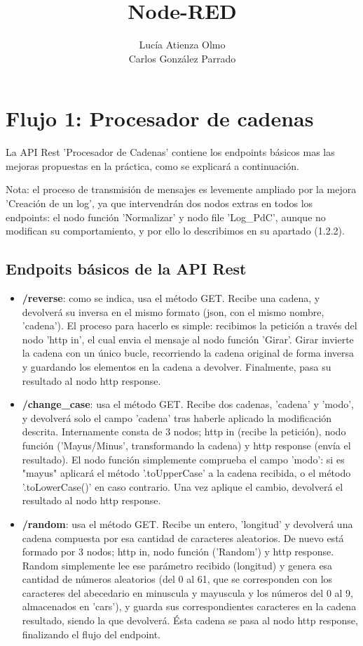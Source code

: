 \documentclass{article}
\title{Node-RED}
\author{Lucía Atienza Olmo

Carlos González Parrado}
\date{}
\affil{Sistemas Distribuidos\\ Grado en Ingeniería Informática\\ Universidad de Cádiz}
\begin{document}
\maketitle


\section{Flujo 1: Procesador de cadenas}
\bigskip

La API Rest 'Procesador de Cadenas' contiene los endpoints básicos mas las mejoras propuestas en la práctica, como se explicará a continuación.
\bigskip

Nota: el proceso de transmisión de mensajes es levemente ampliado por la mejora 'Creación de un log', ya que intervendrán dos nodos extras en todos los endpoints: el nodo función 'Normalizar' y nodo file 'Log\_PdC', aunque no modifican su comportamiento, y por ello lo describimos en su apartado (1.2.2).

\subsection{Endpoits básicos de la API Rest}
\begin{itemize}
\item \textbf{/reverse}: como se indica, usa el método GET. Recibe una cadena, y devolverá su inversa en el mismo formato (json, con el mismo nombre, 'cadena'). El proceso para hacerlo es simple: recibimos la petición a través del nodo 'http in', el cual envia el mensaje al nodo función 'Girar'. Girar invierte la cadena con un único bucle, recorriendo la cadena original de forma inversa y guardando los elementos en la cadena a devolver. Finalmente, pasa su resultado al nodo http response.

\item \textbf{/change\_case}:  usa el método GET. Recibe dos cadenas, 'cadena' y 'modo', y devolverá solo el campo 'cadena' tras haberle aplicado la modificación descrita. Internamente consta de 3 nodos; http in (recibe la petición), nodo función ('Mayus/Minus', transformando la cadena) y http response (envía el resultado). El nodo función simplemente comprueba el campo 'modo': si es "mayus" aplicará el método '.toUpperCase' a la cadena recibida, o el método '.toLowerCase()' en caso contrario. Una vez aplique el cambio, devolverá el resultado al nodo http response.

\item \textbf{/random}: usa el método GET. Recibe un entero, 'longitud' y devolverá una cadena compuesta por esa cantidad de caracteres aleatorios. De nuevo está formado por 3 nodos; http in, nodo función ('Random') y http response. Random simplemente lee ese parámetro recibido (longitud) y genera esa cantidad de números aleatorios (del 0 al 61, que se corresponden con los caracteres del abecedario en minuscula y mayuscula y los números del 0 al 9, almacenados en 'cars'), y guarda sus correspondientes caracteres en la cadena resultado, siendo la que devolverá. Ésta cadena se pasa al nodo http response, finalizando el flujo del endpoint.
\end{itemize}
\end{document}
